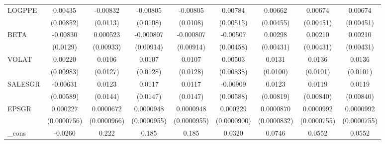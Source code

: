 \begin{table}[htbp]
\begin{tabular}{l*{8}{c}}
LOGPPE              &     0.00435         &    -0.00832         &    -0.00805         &    -0.00805         &     0.00784         &     0.00662         &     0.00674         &     0.00674         \\
                    &   (0.00852)         &    (0.0113)         &    (0.0108)         &    (0.0108)         &   (0.00515)         &   (0.00455)         &   (0.00451)         &   (0.00451)         \\
BETA                &    -0.00830         &    0.000523         &   -0.000807         &   -0.000807         &    -0.00507         &     0.00298         &     0.00210         &     0.00210         \\
                    &    (0.0129)         &   (0.00933)         &   (0.00914)         &   (0.00914)         &   (0.00458)         &   (0.00431)         &   (0.00431)         &   (0.00431)         \\
VOLAT               &     0.00220         &      0.0106         &      0.0107         &      0.0107         &     0.00503         &      0.0131         &      0.0136         &      0.0136         \\
                    &   (0.00983)         &    (0.0127)         &    (0.0128)         &    (0.0128)         &   (0.00838)         &    (0.0100)         &    (0.0101)         &    (0.0101)         \\
SALESGR             &    -0.00631         &      0.0123         &      0.0117         &      0.0117         &    -0.00909         &      0.0123         &      0.0119         &      0.0119         \\
                    &   (0.00589)         &    (0.0144)         &    (0.0147)         &    (0.0147)         &   (0.00588)         &   (0.00819)         &   (0.00840)         &   (0.00840)         \\
EPSGR               &    0.000227\sym{***}&   0.0000672         &   0.0000948         &   0.0000948         &    0.000229\sym{**} &   0.0000870         &   0.0000992         &   0.0000992         \\
                    & (0.0000756)         & (0.0000966)         & (0.0000955)         & (0.0000955)         & (0.0000900)         & (0.0000832)         & (0.0000755)         & (0.0000755)         \\
\_cons              &     -0.0260         &       0.222\sym{***}&       0.185\sym{***}&       0.185\sym{***}&      0.0320         &      0.0746         &      0.0552         &      0.0552         \\

\end{tabular}
\end{table}
